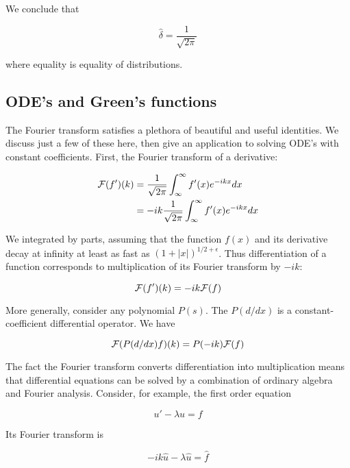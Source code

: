 We conclude that

\begin{equation}
\hat \delta = \frac{1}{\sqrt{2\pi}}
\end{equation}

where equality is equality of distributions.

\subsection{ODE's and Green's functions}

The Fourier transform satisfies a plethora of beautiful and useful identities.  We discuss just a few of these here, then give an application to solving ODE's with constant coefficients.  First, the Fourier transform of a derivative:

\begin{align}
\mathcal{F}(f')(k) &= \frac{1}{\sqrt{2\pi}}\int_{\infty}^{\infty} f'(x) e^{-ikx}dx \\
&= -ik\frac{1}{\sqrt{2\pi}}\int_{\infty}^{\infty} f'(x) e^{-ikx}dx
\end{align}

We integrated by parts, assuming that the function $f(x)$ and its derivative decay at infinity at least as fast as $(1 + |x|)^{1/2 + \epsilon}$.  Thus differentiation of a function corresponds to multiplication of its Fourier transform by $-ik$:

\begin{equation}
\mathcal{F}(f')(k) = -ik\mathcal{F}(f)
\end{equation}

More generally, consider any polynomial $P(s)$.  The $P(d/dx)$ is a constant-coefficient differential operator.  We have

\begin{equation}
\mathcal{F}(P(d/dx)f)(k) = P(-ik)\mathcal{F}(f)
\end{equation}

The fact the Fourier transform converts differentiation into multiplication means that differential equations can be solved by a combination of ordinary algebra and Fourier analysis.  Consider, for example, the first order equation

\begin{equation}
\label{ode1}
 u' - \lambda u = f
\end{equation}

Its Fourier transform is

\begin{equation}
-ik \hat u - \lambda \hat u = \hat f
\end{equation}

